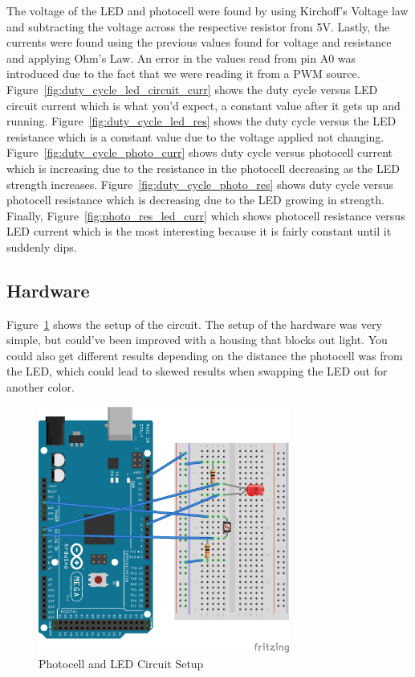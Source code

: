 \documentclass[12pt,titlepage]{article}
\begin{document}
The voltage of the LED and photocell were found by using Kirchoff's Voltage law and subtracting the voltage
across the respective resistor from 5V. Lastly, the currents were found using the previous values found for
voltage and resistance and applying Ohm's Law. An error in the values read from pin A0 was introduced due to
the fact that we were reading it from a PWM source. Figure~\ref{fig:duty_cycle_led_circuit_curr} shows the
duty cycle versus LED circuit current which is what you'd expect, a constant value after it gets up and
running. Figure~\ref{fig:duty_cycle_led_res} shows the duty cycle versus the LED resistance which is a
constant value due to the voltage applied not changing. Figure~\ref{fig:duty_cycle_photo_curr}
shows duty cycle versus photocell current which is increasing due to the resistance in the photocell
decreasing as the LED strength increases. Figure~\ref{fig:duty_cycle_photo_res} shows duty cycle versus
photocell resistance which is decreasing due to the LED growing in strength. Finally,
Figure~\ref{fig:photo_res_led_curr} which shows photocell resistance versus LED current which is the most
interesting because it is fairly constant until it suddenly dips.
\subsection{Hardware}
Figure~\ref{fig:lab_3_schem} shows the setup of the circuit. The setup of the hardware was very simple, but
could've been improved with a housing that blocks out light. You could also get different results depending
on the distance the photocell was from the LED, which could lead to skewed results when swapping the LED out
for another color.
\begin{figure}[!htb]
    \centering
    \includegraphics[width=3.25in]{lab_3/schematic.png}
    \caption{Photocell and LED Circuit Setup}\label{fig:lab_3_schem}
\end{figure}
\clearpage
\end{document}
